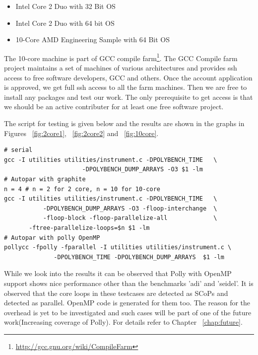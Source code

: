 \begin{itemize}
\item Intel Core 2 Duo with 32 Bit OS
\item Intel Core 2 Duo with 64 bit OS
\item 10-Core AMD Engineering Sample with 64 Bit OS
\end{itemize}
The 10-core machine is part of GCC compile farm\footnote{\url{http://gcc.gnu.org/wiki/CompileFarm}}. The GCC Compile farm project maintains
a set of machines of various architectures and provides ssh access to free software developers, GCC and others.
Once the account application  is approved, we get full ssh access to all the farm machines. Then we
are free to install any packages and test our work. The only prerequisite to get access is that
we should be an active contributer for at least one free software project.

The script for testing is given below and the results are shown in the graphs in
Figures ~\ref{fig:2core1}, ~\ref{fig:2core2} and ~\ref{fig:10core}.
{\footnotesize
\begin{lstlisting}
# serial
gcc -I utilities utilities/instrument.c -DPOLYBENCH_TIME   \
                      -DPOLYBENCH_DUMP_ARRAYS -O3 $1 -lm
# Autopar with graphite
n = 4 # n = 2 for 2 core, n = 10 for 10-core
gcc -I utilities utilities/instrument.c -DPOLYBENCH_TIME   \
           -DPOLYBENCH_DUMP_ARRAYS -O3 -floop-interchange  \
           -floop-block -floop-parallelize-all             \
	   -ftree-parallelize-loops=$n $1 -lm
# Autopar with polly OpenMP
pollycc -fpolly -fparallel -I utilities utilities/instrument.c \
              -DPOLYBENCH_TIME -DPOLYBENCH_DUMP_ARRAYS  $1 -lm
\end{lstlisting}
}
While we look into the results it can be observed that Polly with OpenMP support
shows nice performance other than the benchmarks 'adi' and 'seidel'. It is observed
that the core loops in these testcases are detected as SCoPs and detected as parallel. OpenMP
code is generated for them too. The reason for the overhead is yet to be investigated and such cases will be part of one
of the future work(Increasing coverage of Polly). For details refer to Chapter ~\ref{chap:future}.



